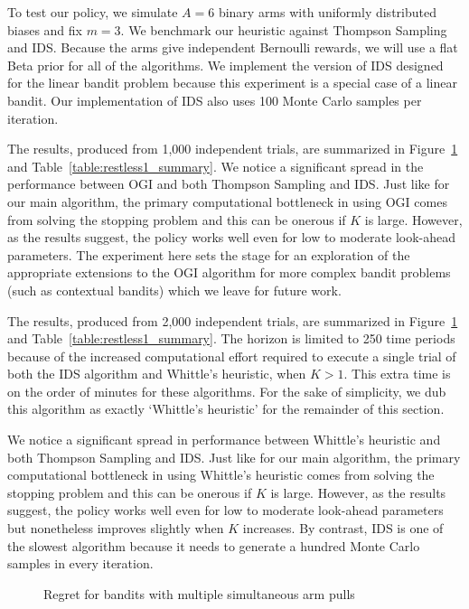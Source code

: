 To test our policy, we simulate $A = 6$ binary arms with uniformly distributed biases and fix $m=3$. 
We benchmark our heuristic against Thompson Sampling and IDS. Because the arms give independent Bernoulli rewards, we will use a flat Beta prior for all of the algorithms. We implement the version of IDS designed for the linear bandit problem because this experiment is a special case of a linear bandit. Our implementation of IDS also uses 100 Monte Carlo samples per iteration.

The results, produced from 1,000 independent trials, are summarized in Figure~\ref{fig:restless1} and Table~\ref{table:restless1_summary}. We notice a significant spread in the performance between OGI and both Thompson Sampling and IDS. Just like for our main algorithm, the primary computational bottleneck in using OGI comes from solving the stopping problem and this can be onerous if $K$ is large. However, as the results suggest, the policy works well even for low to moderate look-ahead parameters. The experiment here sets the stage for an exploration of the appropriate extensions to the OGI algorithm for more complex bandit problems (such as contextual bandits) which we leave for future work. 

The results, produced from 2,000 independent trials, are summarized in Figure~\ref{fig:restless1} and Table~\ref{table:restless1_summary}. The horizon is limited to 250 time periods because of the increased computational effort required to execute a single trial of both the IDS algorithm and Whittle's heuristic, when $K > 1$. This extra time is on the order of minutes for these algorithms.
For the sake of simplicity, we dub this algorithm as exactly `Whittle's heuristic' for the remainder of this section.

We notice a significant spread in performance between Whittle's heuristic and both Thompson Sampling and IDS. Just like for our main algorithm, the primary computational bottleneck in using Whittle's heuristic comes from solving the stopping problem and this can be onerous if $K$ is large. However, as the results suggest, the policy works well even for low to moderate look-ahead parameters but nonetheless improves slightly when $K$ increases. By contrast, IDS is one of the slowest algorithm because it needs to generate a hundred Monte Carlo samples in every iteration.

\begin{figure}
	\centering
	
	\caption{Regret for bandits with multiple simultaneous arm pulls}
	\label{fig:restless1}
\end{figure}

